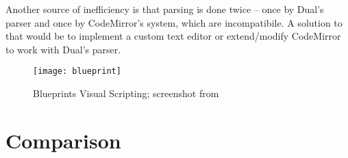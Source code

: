 Another source of inefficiency is that parsing is done twice -- once by Dual's
parser and once by CodeMirror's system, which are incompatibile.  A solution to
that would be to implement a custom text editor or extend/modify CodeMirror to
work with Dual's parser.


\begin{figure}[h!]
\centering \texttt{[image: blueprint]}
\caption{
    Blueprints Visual Scripting;
    screenshot from \protect\cite{fig_blueprint2}
}
\label{fig:blueprint2}
\end{figure}

\section{Comparison}
